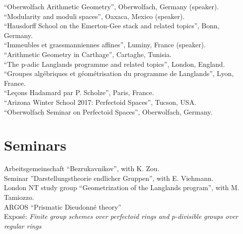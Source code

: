 \documentclass[12pt]{article} %
\begin{document}
``Oberwolfach Arithmetic Geometry'', Oberwolfach, Germany (speaker).\\

``Modularity and moduli spaces'', Oaxaca, Mexico (speaker). \\
 
 ``Hausdorff School on the Emerton-Gee stack and related topics'', Bonn, Germany. \\
 
``Immeubles et grassmanniennes affines'',  Luminy, France (speaker). \\

``Arithmetic Geometry in Carthage'', Cartaghe, Tunisia. \\

``The p-adic Langlands programme and related topics'', London, England.\\

``Groupes algébriques et géométrisation du programme de Langlands'', Lyon, France. \\

``Leçons Hadamard par P. Scholze'', Paris, France. \\

``Arizona Winter School 2017: Perfectoid Spaces'', Tucson, USA.\\

``Oberwolfach Seminar on Perfectoid Spaces'', Oberwolfach, Germany.


\section*{Seminars}

Arbeitsgemeinschaft ``Bezrukavnikov'', with K. Zou.\\

Seminar ''Darstellungstheorie  endlicher Gruppen'', with E. Viehmann. \\

  London NT study group ``Geometrization of the Langlands program'', with M. Tamiozzo. \\


\iffalse
 ARGOS ``Prismatic Dieudonné theory''\\
Exposé: {\it Finite group schemes over perfectoid rings and $p$-divisible groups over regular rings}\\
\end{document}
